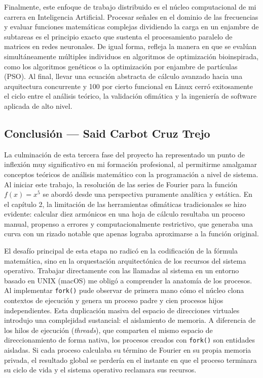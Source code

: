 Finalmente, este enfoque de trabajo distribuido es el núcleo computacional de mi carrera en Inteligencia Artificial. Procesar señales en el dominio de las frecuencias y evaluar funciones matemáticas complejas dividiendo la carga en un enjambre de subtareas es el principio exacto que sustenta el procesamiento paralelo de matrices en redes neuronales. De igual forma, refleja la manera en que se evalúan simultáneamente múltiples individuos en algoritmos de optimización bioinspirada, como los algoritmos genéticos o la optimización por enjambre de partículas (PSO). Al final, llevar una ecuación abstracta de cálculo avanzado hacia una arquitectura concurrente y 100 por cierto funcional en Linux cerró exitosamente el ciclo entre el análisis teórico, la validación ofimática y la ingeniería de software aplicada de alto nivel.

\clearpage
\subsection{Conclusión — Said Carbot Cruz Trejo}
\label{sec:cap03:concl:said}

La culminación de esta tercera fase del proyecto ha representado un punto de inflexión muy significativo en mi formación profesional, al permitirme amalgamar conceptos teóricos de análisis matemático con la programación a nivel de sistema. Al iniciar este trabajo, la resolución de las series de Fourier para la función $f(x) = x^{5}$ se abordó desde una perspectiva puramente analítica y estática. En el capítulo 2, la limitación de las herramientas ofimáticas tradicionales se hizo evidente: calcular diez armónicos en una hoja de cálculo resultaba un proceso manual, propenso a errores y computacionalmente restrictivo, que generaba una curva con un rizado notable que apenas lograba aproximarse a la función original.

El desafío principal de esta etapa no radicó en la codificación de la fórmula matemática, sino en la orquestación arquitectónica de los recursos del sistema operativo. Trabajar directamente con las llamadas al sistema en un entorno basado en UNIX (macOS) me obligó a comprender la anatomía de los procesos. Al implementar \texttt{fork()} pude observar de primera mano cómo el núcleo clona contextos de ejecución y genera un proceso padre y cien procesos hijos independientes. Esta duplicación masiva del espacio de direcciones virtuales introdujo una complejidad sustancial: el aislamiento de memoria. A diferencia de los hilos de ejecución (\textit{threads}), que comparten el mismo espacio de direccionamiento de forma nativa, los procesos creados con \texttt{fork()} son entidades aisladas. Si cada proceso calculaba su término de Fourier en su propia memoria privada, el resultado global se perdería en el instante en que el proceso terminara su ciclo de vida y el sistema operativo reclamara sus recursos.

